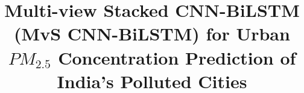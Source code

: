 \documentclass[a4paper, fleqn]{cas-sc}
\theoremstyle{definition}
\theoremstyle{remark}
\begin{document}
\let\WriteBookmarks\relax
\def\floatpagepagefraction{1}
\def\textpagefraction{.001}



\title [mode = title]{Multi-view Stacked CNN-BiLSTM (MvS CNN-BiLSTM) for Urban $PM_{2.5}$ Concentration Prediction of India's Polluted Cities}  

\end{document}
